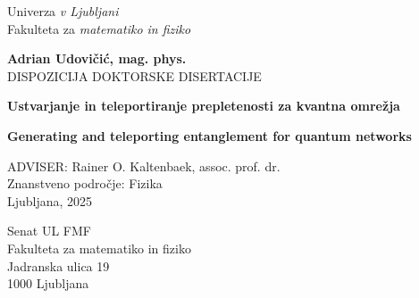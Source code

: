 \documentclass{article}
\theoremstyle{mytheoremstyle}
\theoremstyle{mytheoremstyle}
\theoremstyle{myproblemstyle}
\begin{document}
\begin{titlepage}
	\begin{center}
		{\LARGE Univerza \textit{v Ljubljani}} \\[0.1cm]
		{\LARGE Fakulteta za \textit{matematiko in fiziko}} \\[1cm]
		\begin{figure}[h]
			\centering
			\def\svgwidth{0.5\columnwidth}
			
			\label{fig:UL logo}
		\end{figure}
		{\large \textbf{Adrian Udovičić, mag. phys.}}\\[0.1cm]
		{\sc DISPOZICIJA DOKTORSKE DISERTACIJE}\\
		\vspace{1cm}

		{\bf \Large Ustvarjanje in teleportiranje prepletenosti za kvantna omrežja}\\
		\vspace{1cm}

		{\bf \Large Generating and teleporting entanglement for quantum networks}\\


		\vspace{3cm}

		{\large ADVISER: Rainer O. Kaltenbaek, assoc. prof. dr.\\

			\vspace{2cm}
			Znanstveno področje: Fizika\\
			\vspace{1cm}
			Ljubljana, 2025\date{}}
	\end{center}
\end{titlepage}
\clearpage
\pagestyle{plain}

\vspace{1cm}

\noindent Senat UL FMF\\
Fakulteta za matematiko in fiziko\\
Jadranska ulica 19\\
1000 Ljubljana\\
\end{document}
